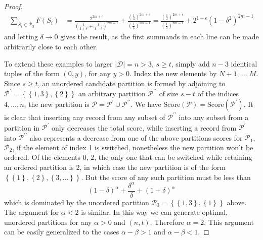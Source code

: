 \documentclass{article}
\theoremstyle{case}
\begin{document}
\begin{proof}
\begin{align*}
\sum_{S_i \in \mathcal{P}_3}F(S_i) & = \frac{2^{2m+\epsilon}}{\left(\frac{1}{1+\delta} + \frac{1}{1-\delta}\right)^{2m-1}}  + \frac{\left( \frac{1}{\delta}\right)^{2m+\epsilon}}{\left(\frac{1}{\delta}\right)^{2m-1}} = \frac{\left( \frac{1}{\delta}\right)^{2m+\epsilon}}{\left(\frac{1}{\delta}\right)^{2m-1}} + 2^{1+\epsilon}\left( 1 - \delta^2\right)^{2m-1} 
\end{align*}
and letting $\delta \rightarrow 0$ gives the result, as the first summands in each line can be made arbitrarily close to each other.

To extend these examples to larger $\vert \mathcal{D} \vert = n > 3$, $s \geq t$, simply add $n-3$ identical tuples of the form $(0, y)$, for any $y > 0$. Index the new elements by $N+1, \dots, M$. Since $s \geq t$, an unordered candidate partition is formed by adjoining to $\mathcal{P}^{\prime} = \left\lbrace \left\lbrace1, 3\right\rbrace, \left\lbrace 2\right\rbrace \right\rbrace$ an arbitrary partition $\mathcal{P}^{\prime\prime}$ of size $s - t$ of the indices $4, \dots, n$, the new partition is $\mathcal{P} = \mathcal{P}^{\prime} \cup \mathcal{P}^{\prime\prime}$. We have $\text{Score}\left(\mathcal{P}\right) = \text{Score}\left(\mathcal{P}^{\prime}\right)$. It is clear that inserting any record from any subset of $\mathcal{P}^{\prime\prime}$ into any subset from a partition in $\mathcal{P}^{\prime}$ only decreases the total score, while inserting a record from $\mathcal{P}^{\prime}$ into $\mathcal{P}^{\prime\prime}$ also represents a decrease from one of the above partitions scores for $\mathcal{P}_1$, $\mathcal{P}_2$, if the element of index 1 is switched, nonetheless the new partition won't be ordered. Of the elements 0, 2, the only one that can be switched while retaining an ordered partition is 2, in which case the new partition is of the form $\left\lbrace \left\lbrace 1\right\rbrace, \left\lbrace 2\right\rbrace, \left\lbrace 3, \dots\right\rbrace \right\rbrace$. But the score of any such partition must be less than
\[
\left( 1-\delta\right)^\alpha + \frac{\delta^\alpha}{\delta} + \left( 1+\delta\right)^\alpha
\]
which is dominated by the unordered partition $\mathcal{P}_3 = \left\lbrace \left\lbrace 1, 3 \right\rbrace, \left\lbrace 1 \right\rbrace \right\rbrace$ above. The argument for $\alpha < 2$ is similar. In this way we can generate optimal, unordered partitions for any $\alpha > 0$ and $\left( n, t\right)$. Therefore $\alpha = 2$. This argument can be easily generalized to the cases $\alpha - \beta > 1$ and $\alpha - \beta < 1$. 

\end{proof}
\end{document}
